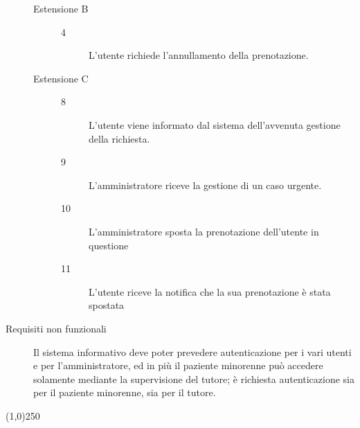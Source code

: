 \begin{description}
\begin{description}
\end{description}
                
\begin{description}
	\item[Estensione B]
	\medskip
	
	\begin{description}
	\item[4]
	L'utente richiede l'annullamento della prenotazione. 
	\end{description}
\end{description}

\begin{description}
	\item[Estensione C]
	\medskip
	
	\begin{description}
	\item[8]
	L'utente viene informato dal sistema dell'avvenuta gestione della richiesta.
	\item[9]
	L'amministratore riceve la gestione di un caso urgente.
	\item[10]
	L'amministratore sposta la prenotazione dell'utente in questione
	\item[11]
	L'utente riceve la notifica che la sua prenotazione è stata spostata
	\end{description}
\end{description}
\item[Requisiti non funzionali]
\begin{itemize}
\diam Il sistema informativo deve poter prevedere autenticazione per i vari
	utenti e per l'amministratore, ed in più il paziente minorenne può accedere solamente mediante
	la supervisione del tutore; è richiesta autenticazione  sia per il
	paziente minorenne, sia per il tutore.
\end{itemize}
\end{description}



\begin{center}
\line(1,0){250}
\end{center}


